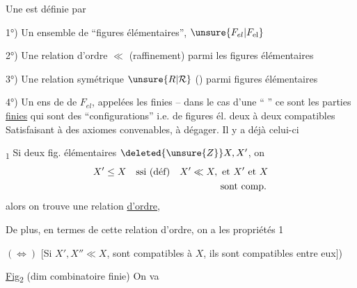 Une \uline{} est définie par

1°) Un ensemble de ``figures élémentaires'', $\unsure{F_{el}|F_{\mathrm{el}}}$

2°) Une relation d'ordre $\ll$  (raffinement) parmi les figures élémentaires

3°) Une relation  symétrique $\unsure{R|\mathcal{R}}$ () parmi figures élémentaires


4°) Un ens de  de $F_{el}$, appelées les \unsure{---} finies -- dans le cas d'une `` '' ce sont les parties \uline{finies} qui sont des ``configurations''  i.e.  de figures él. deux à deux compatibles
Satisfaisant à des axiomes convenables, à dégager. Il y a déjà celui-ci

\uline{}\textsubscript{1}  Si  deux fig. élémentaires $\deleted{\unsure{Z}}X, X'$, on 
\[
\begin{aligned}
X'\leq X\quad &\text{ssi (déf)}\quad X'\ll X,\ \text{et }X'\text{ et }X\\
&\hphantom{\text{ssi (déf)}\quad X'\ll X,\ }\text{sont comp.}
\end{aligned}
\]
alors on trouve une relation \uline{d'ordre},

De plus, en termes de cette relation d'ordre, on a les propriétés \uline{} 1

\margin{$\vert\vert\vert$}
$(\Longleftrightarrow)$ [Si $X', X''\ll X$,  sont compatibles à $X$, ils sont compatibles entre eux])

\uline{Fig}\textsubscript{2} (dim combinatoire finie) On va
